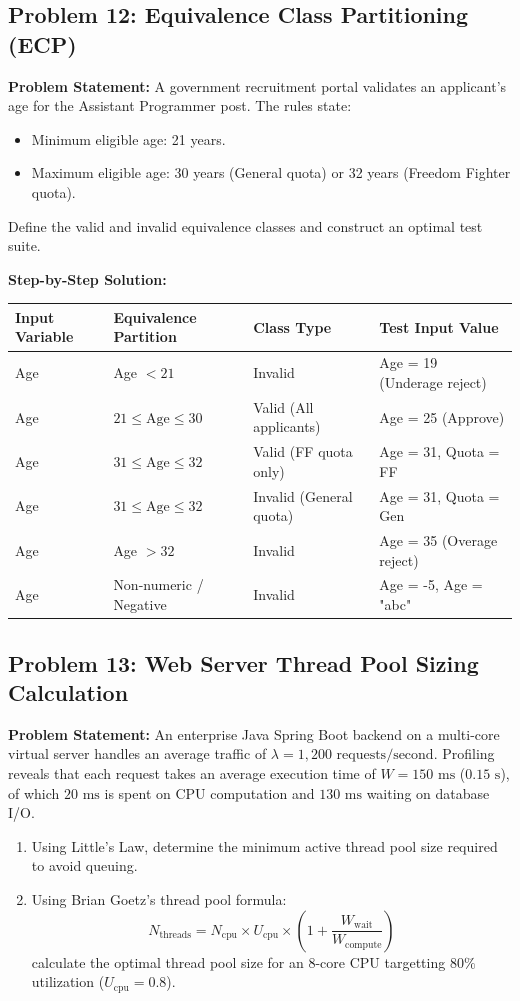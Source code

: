 \subsection*{Problem 12: Equivalence Class Partitioning (ECP)}
\textbf{Problem Statement:} A government recruitment portal validates an applicant's age for the Assistant Programmer post. The rules state:
\begin{itemize}
    \item Minimum eligible age: 21 years.
    \item Maximum eligible age: 30 years (General quota) or 32 years (Freedom Fighter quota).
\end{itemize}
Define the valid and invalid equivalence classes and construct an optimal test suite.

\textbf{Step-by-Step Solution:}
\begin{center}
\small
\begin{tabularx}{\textwidth}{p{2.5cm} X p{3.2cm} p{3.8cm}}
\toprule
\textbf{Input Variable} & \textbf{Equivalence Partition} & \textbf{Class Type} & \textbf{Test Input Value} \\
\midrule
Age & Age $< 21$ & Invalid & Age = 19 (Underage reject) \\
Age & $21 \le \text{Age} \le 30$ & Valid (All applicants) & Age = 25 (Approve) \\
Age & $31 \le \text{Age} \le 32$ & Valid (FF quota only) & Age = 31, Quota = FF \\
Age & $31 \le \text{Age} \le 32$ & Invalid (General quota) & Age = 31, Quota = Gen \\
Age & Age $> 32$ & Invalid & Age = 35 (Overage reject) \\
Age & Non-numeric / Negative & Invalid & Age = -5, Age = "abc" \\
\bottomrule
\end{tabularx}
\end{center}

\subsection*{Problem 13: Web Server Thread Pool Sizing Calculation}
\textbf{Problem Statement:} An enterprise Java Spring Boot backend on a multi-core virtual server handles an average traffic of $\lambda = 1,200\text{ requests/second}$. Profiling reveals that each request takes an average execution time of $W = 150\text{ ms}$ ($0.15\text{ s}$), of which $20\text{ ms}$ is spent on CPU computation and $130\text{ ms}$ waiting on database I/O.
\begin{enumerate}[label=(\alph*)]
    \item Using Little's Law, determine the minimum active thread pool size required to avoid queuing.
    \item Using Brian Goetz's thread pool formula:
    \[
    N_{\text{threads}} = N_{\text{cpu}} \times U_{\text{cpu}} \times \left(1 + \frac{W_{\text{wait}}}{W_{\text{compute}}}\right)
    \]
    calculate the optimal thread pool size for an 8-core CPU targetting $80\%$ utilization ($U_{\text{cpu}} = 0.8$).
\end{enumerate}


